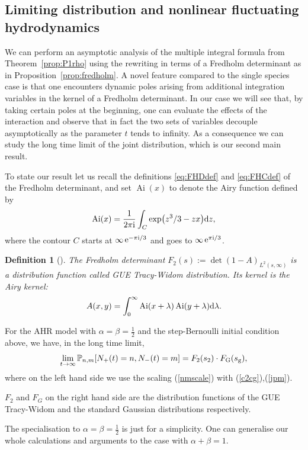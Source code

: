 \documentclass[cmp]{svjour}
\numberwithin{theorem}{section}
\numberwithin{equation}{section}
\DeclareMathOperator{\e}{e}
\DeclareMathOperator{\Ai}{Ai}
\def\dd{{\rm d}}
\def\ii{{\rm i}}
\def\i{{\infty}}
\newtheorem{defn}[theorem]{Definition}
\begin{document}
\subsection{Limiting distribution and nonlinear fluctuating hydrodynamics}
We can perform an asymptotic analysis of the multiple integral formula from Theorem~\ref{prop:P1rho} using the rewriting in terms of a Fredholm determinant as in Proposition~\ref{prop:fredholm}. A novel feature compared to the single species case is that one encounters dynamic poles arising from additional integration variables in the kernel of a Fredholm determinant. In our case we will see that, by taking certain poles at the beginning, one can evaluate the effects of the interaction and observe that in fact the two sets of variables decouple asymptotically as the parameter $t$ tends to infinity. As a consequence we can study the long time limit of the joint distribution, which is our second main result.

To state our result let us recall the definitions \eqref{eq:FHDdef} and \eqref{eq:FHCdef} of the Fredholm determinant, and set $\Ai(x)$ to denote the Airy function \cite{TW1994,bowick1991universal,forrester1993spectrum,moore1990matrix} defined by 
\begin{equation}\label{def:airy_function}
\Ai(x) = \frac{1}{2 \pi \ii} \int_C \exp(z^3/3-zx) \dd z,
\end{equation}
where the contour $C$ starts at $\i \e^{- \pi \ii /3}$ and goes to $\i \e^{\pi \ii /3}$.

\medskip

\begin{defn}[\cite{TW1994}]\label{def:GUETW_dist}
 The Fredholm determinant $F_2(s):=\det(1 - A)_{L^2(s,\infty)}$ is a distribution function called GUE Tracy-Widom distribution.
 Its kernel is the Airy kernel: 
 \begin{equation} \label{def:airy_kernel}
     A(x,y)= \int_0^{\i} \Ai(x+\lambda) \Ai(y+\lambda) \dd \lambda .
 \end{equation}
\end{defn}

\begin{theorem}
 \label{th:limitdistr}
For the AHR model with $\alpha=\beta=\frac12$ and the step-Bernoulli initial condition above, we have, in the long time limit, 
\begin{align}
	\lim_{t\to\infty}  \mathbb{P}_{n,m}[N_+(t)=n,N_-(t)=m]
	=F_{\text {2}}(s_{2})\cdot F_{\text G}(s_{\rm g}), 
	\label{PnmFF}
\end{align}
where on the left hand side we use the scaling (\ref{nmscale}) with (\ref{c2cg}),(\ref{jpm}).  

$F_2$ and $F_G$ on the right hand side are the distribution functions of the GUE Tracy-Widom and the standard Gaussian distributions respectively.
\end{theorem}
The specialisation to $\alpha=\beta=\frac12$ is just for a simplicity. One can generalise our whole calculations and arguments to the case with $\alpha+\beta=1$.
\end{document}
